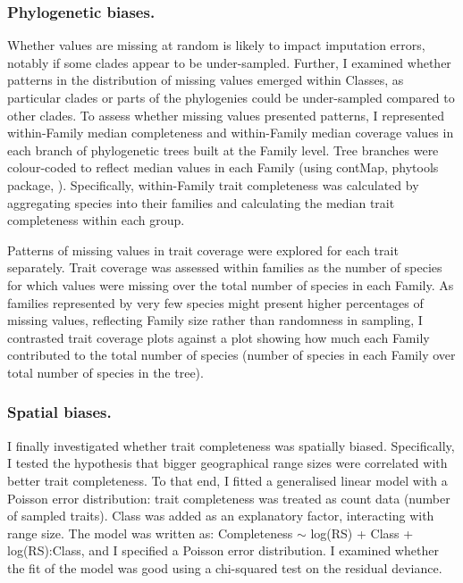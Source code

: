 \subsubsection{Phylogenetic biases.}
Whether values are missing at random is likely to impact imputation errors, notably if some clades appear to be under-sampled. Further, I examined whether patterns in the distribution of missing values emerged within Classes, as particular clades or parts of the phylogenies could be under-sampled compared to other clades. To assess whether missing values presented patterns, I represented within-Family median completeness and within-Family median coverage values in each branch of phylogenetic trees built at the Family level. Tree branches were colour-coded to reflect median values in each Family (using contMap, phytools package, \cite{Revell2016}). Specifically, within-Family trait completeness was calculated by aggregating species into their families and calculating the median trait completeness within each group. 

Patterns of missing values in trait coverage were explored for each trait separately. Trait coverage was assessed within families as the number of species for which values were missing over the total number of species in each Family. As families represented by very few species might present higher percentages of missing values, reflecting Family size rather than randomness in sampling, I contrasted trait coverage plots against a plot showing how much each Family contributed to the total number of species (number of species in each Family over total number of species in the tree).

\subsubsection{Spatial biases.} I finally investigated whether trait completeness was spatially biased. Specifically, I tested the hypothesis that bigger geographical range sizes were correlated with better trait completeness. To that end, I fitted a generalised linear model with a Poisson error distribution: trait completeness was treated as count data (number of sampled traits). Class was added as an explanatory factor, interacting with range size. The model was written as: Completeness $\sim$ log(RS) + Class + log(RS):Class, and I specified a Poisson error distribution. I examined whether the fit of the model was good using a chi-squared test on the residual deviance.\\

